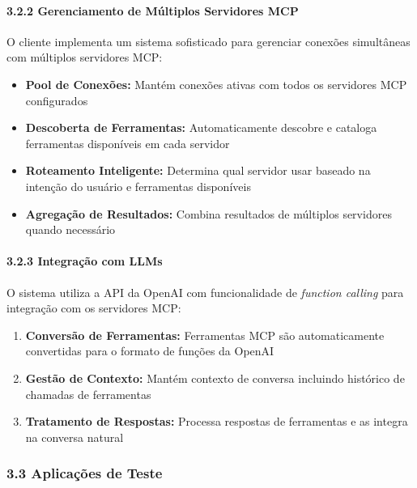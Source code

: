 \documentclass[
]{article}
\providecommand{\tightlist}{%
  \setlength{\itemsep}{0pt}\setlength{\parskip}{0pt}}
\begin{document}
\paragraph{3.2.2 Gerenciamento de Múltiplos Servidores
MCP}\label{gerenciamento-de-muxfaltiplos-servidores-mcp}

O cliente implementa um sistema sofisticado para gerenciar conexões
simultâneas com múltiplos servidores MCP:

\begin{itemize}
\tightlist
\item
  \textbf{Pool de Conexões:} Mantém conexões ativas com todos os
  servidores MCP configurados
\item
  \textbf{Descoberta de Ferramentas:} Automaticamente descobre e
  cataloga ferramentas disponíveis em cada servidor
\item
  \textbf{Roteamento Inteligente:} Determina qual servidor usar baseado
  na intenção do usuário e ferramentas disponíveis
\item
  \textbf{Agregação de Resultados:} Combina resultados de múltiplos
  servidores quando necessário
\end{itemize}

\paragraph{3.2.3 Integração com LLMs}\label{integrauxe7uxe3o-com-llms}

O sistema utiliza a API da OpenAI com funcionalidade de \emph{function
calling} para integração com os servidores MCP:

\begin{enumerate}
\def\labelenumi{\arabic{enumi}.}
\tightlist
\item
  \textbf{Conversão de Ferramentas:} Ferramentas MCP são automaticamente
  convertidas para o formato de funções da OpenAI
\item
  \textbf{Gestão de Contexto:} Mantém contexto de conversa incluindo
  histórico de chamadas de ferramentas
\item
  \textbf{Tratamento de Respostas:} Processa respostas de ferramentas e
  as integra na conversa natural
\end{enumerate}

\subsubsection{3.3 Aplicações de Teste}\label{aplicauxe7uxf5es-de-teste}
\end{document}

